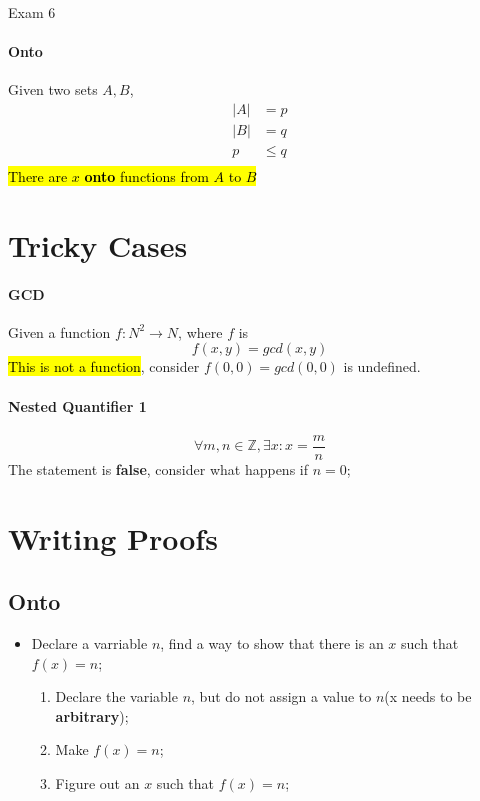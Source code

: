 \documentclass{note}
\begin{document}
\begin{note}{Exam 6}
        \paragraph{Onto}
        Given two sets $ A, B $,
        \begin{align*}
            \left| A \right| &= p\\
            \left| B \right| &= q\\
            p &\leq q\\
        \end{align*}
        \hl{There are $ x $ \textbf{onto} functions from $ A $ to $ B $}

        \section{Tricky Cases}

        \paragraph{GCD}
        Given a function $ f: N^{2} \to N $, where $ f $ is
        \begin{displaymath}
            f(x,y) = gcd(x,y)
        \end{displaymath}
        \hl{This is not a function}, consider $ f(0,0) = gcd(0,0) $ is undefined.

        \paragraph{Nested Quantifier 1}
        \begin{displaymath}
            \forall m, n \in \mathbb{Z}, \exists x: x = \frac{m}{n}
        \end{displaymath}
        The statement is \textbf{false}, consider what happens if $ n = 0 $;

        \section{Writing Proofs}

        \subsection{Onto}

        \begin{itemize}
            \item Declare a varriable $ n $, find a way to show that there is an $ x $
            such that $ f(x) = n $;
            \begin{enumerate}
                \item Declare the variable $ n $, but do not assign a value to $ n $(x needs to be \textbf{arbitrary});
                \item Make $ f(x) = n $;
                \item Figure out an $ x $ such that $ f(x) = n $;
            \end{enumerate}
        \end{itemize}


    \end{note}
\end{document}
